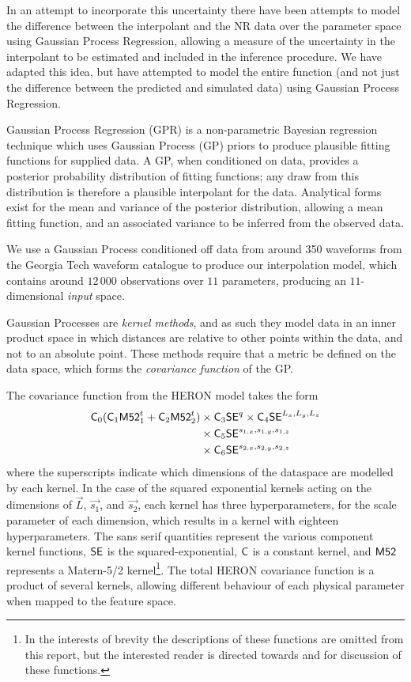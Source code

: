 \documentclass[openleft]{kentigern}
\theoremstyle{definition}
\begin{document}
In an attempt to incorporate this uncertainty there have been attempts
to model the difference between the interpolant and the NR data over
the parameter space\cite{2014PhRvL.113y1101M,2016PhRvD..93f4001M}
using Gaussian Process Regression, allowing a measure of the
uncertainty in the interpolant to be estimated and included in the
inference procedure. We have adapted this idea, but have attempted to
model the entire function (and not just the difference between the
predicted and simulated data) using Gaussian Process Regression.

Gaussian Process Regression (GPR) is a non-parametric Bayesian
regression technique which uses Gaussian Process (GP) priors to
produce plausible fitting functions for supplied data. A GP, when
conditioned on data, provides a posterior probability distribution of
fitting functions; any draw from this distribution is therefore a
plausible interpolant for the data. Analytical forms exist for the
mean and variance of the posterior distribution, allowing a mean
fitting function, and an associated variance to be inferred from the
observed data.

We use a Gaussian Process conditioned off data from around 350
waveforms from the Georgia Tech waveform catalogue\cite{gatechcat} to
produce our interpolation model, which contains around $12\,000$
observations over $11$ parameters, producing an $11$-dimensional
\emph{input} space.

Gaussian Processes are \emph{kernel methods}, and as such they model
data in an inner product space in which distances are relative to
other points within the data, and not to an absolute point. These
methods require that a metric be defined on the data space, which
forms the \emph{covariance function} of the GP.

The covariance function from the HERON model takes the form
\begin{align}
  \label{eq:heron-kernel}
  \mathsf{C}_0 ( \mathsf{C}_1 \mathsf{M52}^{t}_1 + \mathsf{C}_2 \mathsf{M52}^{t}_2 ) &\times \mathsf{C}_3 \mathsf{SE}^{q} 
  \times \mathsf{C}_4 \mathsf{SE}^{L_x,L_y,L_z} \nonumber \\ 
  &\times \mathsf{C}_5 \mathsf{SE}^{s_{1,x}, s_{1,y}, s_{1,z}} \nonumber\\ &\times \mathsf{C}_6 \mathsf{SE}^{s_{2,x}, s_{2,y}, s_{2,z}}
\end{align}
where the superscripts indicate which dimensions of the dataspace are
modelled by each kernel. In the case of the squared exponential
kernels acting on the dimensions of $\vec{L}$, $\vec{s_1}$, and
$\vec{s_2}$, each kernel has three hyperparameters, for the scale
parameter of each dimension, which results in a kernel with eighteen
hyperparameters. The sans serif quantities represent the various
component kernel functions, $\mathsf{SE}$ is the squared-exponential, $\mathsf{C}$
is a constant kernel, and $\mathsf{M52}$ represents a Matern-5/2
kernel\footnote{In the interests of brevity the descriptions of these
  functions are omitted from this report, but the interested reader is
  directed towards \cite{rasmussen2006gaussian} and
  \cite{barberBRML2012} for discussion of these functions.}. The total
HERON covariance function is a product of several kernels, allowing
different behaviour of each physical parameter when mapped to the
feature space.
\end{document}
